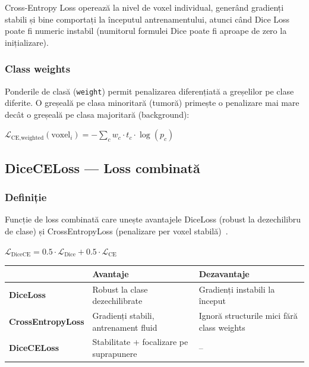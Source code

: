 \documentclass[12pt, a4paper]{report}
\newcommand{\formula}[1]{%
    \begin{center}
        \colorbox{codebackground}{%
            \parbox{0.88\textwidth}{\centering\vspace{4pt}$#1$\vspace{4pt}}%
        }
    \end{center}
}
\begin{document}
Cross-Entropy Loss operează la nivel de voxel individual, generând gradienți stabili
și bine comportați la începutul antrenamentului, atunci când Dice Loss poate fi numeric
instabil (numitorul formulei Dice poate fi aproape de zero la inițializare).

\subsubsection{Class weights}
\label{sec:classweights}

Ponderile de clasă (\texttt{weight}) permit penalizarea diferențiată a greșelilor
pe clase diferite. O greșeală pe clasa minoritară (tumoră) primește o penalizare
mai mare decât o greșeală pe clasa majoritară (background):

\formula{
    \mathcal{L}_{\text{CE,weighted}}(\text{voxel}_i) = -\sum_{c} w_c \cdot t_c \cdot \log(p_c)
}

\subsection{DiceCELoss — Loss combinată}
\label{sec:diceceloss}

\subsubsection{Definiție}

\vspace{4pt}
\begin{infobox}
Funcție de loss combinată care unește avantajele DiceLoss
(robust la dezechilibru de clase) și CrossEntropyLoss
(penalizare per voxel stabilă)~\cite{isensee2019automated}.
\end{infobox}

\formula{
    \mathcal{L}_{\text{DiceCE}} = 0.5 \cdot \mathcal{L}_{\text{Dice}}
    + 0.5 \cdot \mathcal{L}_{\text{CE}}
}

\begin{center}
\begin{tabular}{p{4cm} p{4.5cm} p{4.5cm}}
    \toprule
    & \textbf{Avantaje} & \textbf{Dezavantaje} \\
    \midrule
    \textbf{DiceLoss} &
        Robust la clase dezechilibrate &
        Gradienți instabili la început \\
    \addlinespace
    \textbf{CrossEntropyLoss} &
        Gradienți stabili, antrenament fluid &
        Ignoră structurile mici fără class weights \\
    \addlinespace
    \textbf{DiceCELoss} &
        Stabilitate + focalizare pe suprapunere &
        -- \\
    \bottomrule
\end{tabular}
\end{center}
\end{document}
